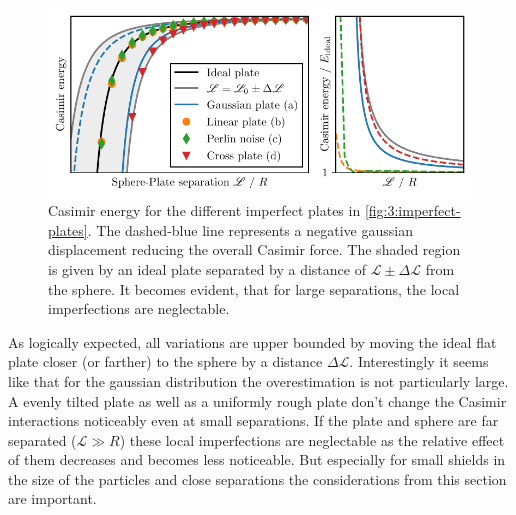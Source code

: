 \begin{figure}[!htbp]
  \centering
  \includegraphics[width=\textwidth]{../figures/casimir/casimir-potential-imperfect-plates-relative.pdf}
  \caption{Casimir energy for the different imperfect plates in \cref{fig:3:imperfect-plates}. The dashed-blue line represents a negative gaussian displacement reducing the overall Casimir force. The shaded region is given by an ideal plate separated by a distance of $\mathscr{L} \pm \Delta\mathscr{L}$ from the sphere. It becomes evident, that for large separations, the local imperfections are neglectable.}
  \label{fig:3:casimir-imperfect-plates}
\end{figure}
As logically expected, all variations are upper bounded by moving the ideal flat plate closer (or farther) to the sphere by a distance $\Delta \mathscr{L}$. Interestingly it seems like that for the gaussian distribution the overestimation is not particularly large.
A evenly tilted plate as well as a uniformly rough plate don't change the Casimir interactions noticeably even at small separations.
If the plate and sphere are far separated ($\mathscr{L} \gg R$) these local imperfections are neglectable as the relative effect of them decreases and becomes less noticeable.
But especially for small shields in the size of the particles and close separations the considerations from this section are important.